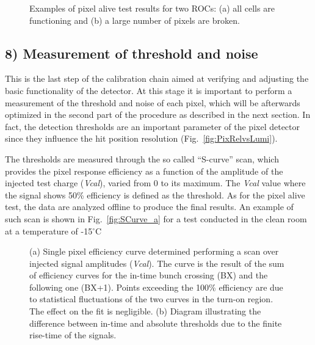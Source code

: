 \begin{figure}[!htb]
 \begin{center}
 \end{center}
 \caption{Examples of pixel alive test results for two ROCs: (a) all cells are functioning and (b) a large number of pixels are broken.}
 \label{fig:PixelAlive}
\end{figure}

\subsection*{8) Measurement of threshold and noise}

This is the last step of the calibration chain aimed at verifying and adjusting the basic functionality of the detector.
At this stage it is important to perform a measurement of the threshold and noise of each pixel, which will be afterwards optimized in the second part of the procedure as described in the next section.
In fact, the detection thresholds are an important parameter of the pixel detector since they influence the hit position resolution (Fig.~\ref{fig:PixRelvsLumi}).

The thresholds are measured through the so called ``S-curve'' scan, which provides the pixel response efficiency as a function of the amplitude of the injected test charge (\textit{Vcal}), varied from 0 to its maximum.
The \textit{Vcal} value where the signal shows 50\% efficiency is defined as the threshold.
As for the pixel alive test, the data are analyzed offline to produce the final results.
An example of such scan is shown in Fig.~\ref{fig:SCurve_a} for a test conducted in the clean room at a temperature of -15\unit{$^\circ$C}.\\

\begin{figure}[!t]
 \begin{center}
 \end{center}
 \caption{(a) Single pixel efficiency curve determined performing a scan over injected signal amplitudes (\textit{Vcal}). The curve is the result of the sum of efficiency curves for the in-time bunch crossing (BX) and the following one (BX+1). Points exceeding the 100\% efficiency are due to statistical fluctuations of the two curves in the turn-on region. The effect on the fit is negligible. (b) Diagram illustrating the difference between in-time and absolute thresholds due to the finite rise-time of the signals.}
 \label{fig:SCurve}
\end{figure}

